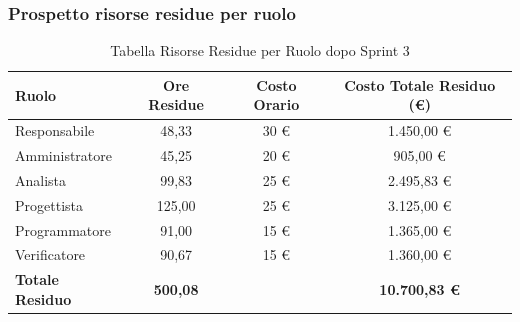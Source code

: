 \subsubsection{Prospetto risorse residue per ruolo}
\begin{table}[H]
    \centering
    \renewcommand{\arraystretch}{1.3}
    \begin{tabularx}{\textwidth}{|X|c|c|c|}
        \hline
        \textbf{Ruolo} & \textbf{Ore Residue} & \textbf{Costo Orario} & \textbf{Costo Totale Residuo (\euro)} \\
        \hline
        Responsabile & 48,33 & 30 \euro & 1.450,00 \euro \\
        Amministratore & 45,25 & 20 \euro & 905,00 \euro \\
        Analista & 99,83 & 25 \euro & 2.495,83 \euro \\
        Progettista & 125,00 & 25 \euro & 3.125,00 \euro \\
        Programmatore & 91,00 & 15 \euro & 1.365,00 \euro \\
        Verificatore & 90,67 & 15 \euro & 1.360,00 \euro \\
        \hline
        \textbf{Totale Residuo} & \textbf{500,08} & & \textbf{10.700,83 \euro} \\
        \hline
    \end{tabularx}
    \caption{Tabella Risorse Residue per Ruolo dopo Sprint 3}
\end{table}

